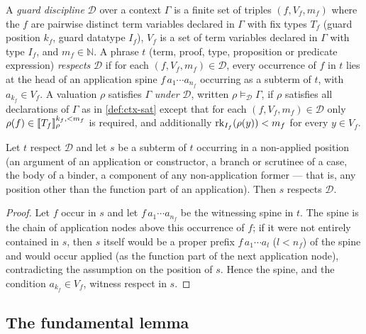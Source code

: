 \begin{definition}
\label{def:discipline}
A \emph{guard discipline} $\mathcal{D}$ over a context $\Gamma$ is a
finite set of triples $(f, V_f, m_f)$ where the $f$ are pairwise distinct
term variables declared in $\Gamma$ with fix types $T_f$ (guard position
$k_f$, guard datatype $I_f$), $V_f$ is a set of term variables declared
in $\Gamma$ with type $I_f$, and $m_f \in \mathbb{N}$.  A phrase $t$
(term, proof, type, proposition or predicate expression) \emph{respects}
$\mathcal{D}$ if for each $(f, V_f, m_f) \in \mathcal{D}$, every
occurrence of $f$ in $t$ lies at the head of an application spine
$f\,a_1 \cdots a_{n_f}$ occurring as a subterm of $t$, with $a_{k_f} \in
V_f$.  A valuation $\rho$ satisfies $\Gamma$ \emph{under} $\mathcal{D}$,
written $\rho \vDash_{\mathcal{D}} \Gamma$, if $\rho$ satisfies all
declarations of $\Gamma$ as in \cref{def:ctx-sat} except that for each
$(f, V_f, m_f) \in \mathcal{D}$ only $\rho(f) \in
[\![ T_f ]\!]_{\rho}^{k_f, < m_f}$ is required, and additionally
$\mathrm{rk}_{I_f}(\rho(y)) < m_f$ for every $y \in V_f$.
\end{definition}

\begin{lemma}
\label{lem:respect-local}
Let $t$ respect $\mathcal{D}$ and let $s$ be a subterm of $t$ occurring
in a non-applied position (an argument of an application or constructor,
a branch or scrutinee of a case, the body of a binder, a component of any
non-application former --- that is, any position other than the function
part of an application).  Then $s$ respects $\mathcal{D}$.
\end{lemma}

\begin{proof}
Let $f$ occur in $s$ and let $f\,a_1 \cdots a_{n_f}$ be the witnessing
spine in $t$.  The spine is the chain of application nodes above this
occurrence of $f$; if it were not entirely contained in $s$, then $s$
itself would be a proper prefix $f\,a_1 \cdots a_l$ ($l < n_f$) of the
spine and would occur applied (as the function part of the next
application node), contradicting the assumption on the position of $s$.
Hence the spine, and the condition $a_{k_f} \in V_f$, witness respect in
$s$.
\end{proof}

\subsection{The fundamental lemma}

